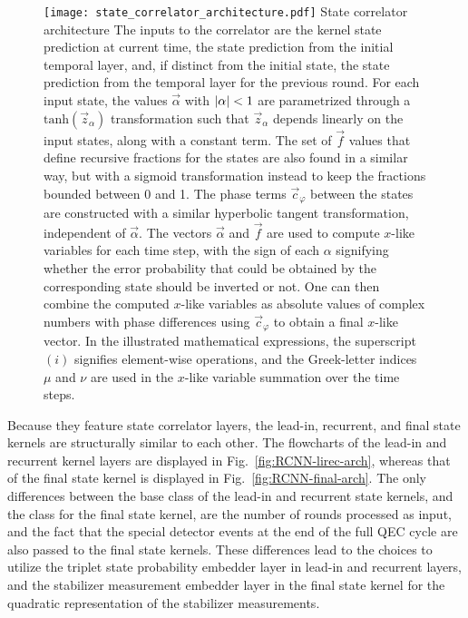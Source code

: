 \begin{figure*}[htb]
\centering
\texttt{[image: state\_correlator\_architecture.pdf]}
\ccaption
{State correlator architecture}
{
The inputs to the correlator are the kernel state prediction at current time, the state prediction from the initial temporal layer, and, if distinct from the initial state, the state prediction from the temporal layer for the previous round. 
For each input state, the values $\vec{\alpha}$ with $\lvert \alpha \rvert<1$ are parametrized through a $\mathrm{tanh}(\vec{z}_\alpha)$ transformation such that $\vec{z}_\alpha$ depends linearly on the input states, along with a constant term. The set of $\vec{f}$ values that define recursive fractions for the states are also found in a similar way, but with a sigmoid transformation instead to keep the fractions bounded between 0 and 1. 
The phase terms $\vec{c}_\varphi$ between the states are constructed with a similar hyperbolic tangent transformation, independent of $\vec{\alpha}$. 
The vectors $\vec{\alpha}$ and $\vec{f}$ are used to compute $x$-like variables for each time step, with the sign of each $\alpha$ signifying whether the error probability that could be obtained by the corresponding state should be inverted or not. One can then combine the computed $x$-like variables as absolute values of complex numbers with phase differences using $\vec{c}_\varphi$ to obtain a final $x$-like vector. In the illustrated mathematical expressions, the superscript $(i)$ signifies element-wise operations, and the Greek-letter indices $\mu$ and $\nu$ are used in the $x$-like variable summation over the time steps.
}
\label{fig:RCNN-state-corr}
\end{figure*}


Because they feature state correlator layers, the lead-in, recurrent, and final state kernels are structurally similar to each other. 
The flowcharts of the lead-in and recurrent kernel layers are displayed in Fig.~\ref{fig:RCNN-lirec-arch}, whereas that of the final state kernel is displayed in Fig.~\ref{fig:RCNN-final-arch}.
The only differences between the base class of the lead-in and recurrent state kernels, and the class for the final state kernel, are the number of rounds processed as input, and the fact that the special detector events at the end of the full QEC cycle are also passed to the final state kernels.
These differences lead to the choices to utilize the triplet state probability embedder layer in lead-in and recurrent layers, and the stabilizer measurement embedder layer in the final state kernel for the quadratic representation of the stabilizer measurements.


